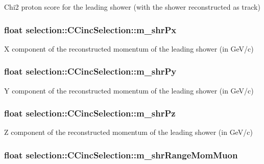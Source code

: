 Chi2 proton score for the leading shower (with the shower reconstructed as track) \hypertarget{classselection_1_1CCincSelection_a9a4858dd265bafd929aca940a2bc1342}{
\subsubsection[{m\-\_\-shr\-Px}]{\setlength{\rightskip}{0pt plus 5cm}float selection\-::\-C\-Cinc\-Selection\-::m\-\_\-shr\-Px\hspace{0.3cm}{\ttfamily [private]}}}\label{classselection_1_1CCincSelection_a9a4858dd265bafd929aca940a2bc1342}
X component of the reconstructed momentum of the leading shower (in Ge\-V/c) \hypertarget{classselection_1_1CCincSelection_af38a589c58d27b98779c05fe6ad078c7}{
\subsubsection[{m\-\_\-shr\-Py}]{\setlength{\rightskip}{0pt plus 5cm}float selection\-::\-C\-Cinc\-Selection\-::m\-\_\-shr\-Py\hspace{0.3cm}{\ttfamily [private]}}}\label{classselection_1_1CCincSelection_af38a589c58d27b98779c05fe6ad078c7}
Y component of the reconstructed momentum of the leading shower (in Ge\-V/c) \hypertarget{classselection_1_1CCincSelection_a8379b0c7d0b8a8d0b62ff0b353505146}{
\subsubsection[{m\-\_\-shr\-Pz}]{\setlength{\rightskip}{0pt plus 5cm}float selection\-::\-C\-Cinc\-Selection\-::m\-\_\-shr\-Pz\hspace{0.3cm}{\ttfamily [private]}}}\label{classselection_1_1CCincSelection_a8379b0c7d0b8a8d0b62ff0b353505146}
Z component of the reconstructed momentum of the leading shower (in Ge\-V/c) \hypertarget{classselection_1_1CCincSelection_a5dff6f4a03bc26649697adbd38241be3}{
\subsubsection[{m\-\_\-shr\-Range\-Mom\-Muon}]{\setlength{\rightskip}{0pt plus 5cm}float selection\-::\-C\-Cinc\-Selection\-::m\-\_\-shr\-Range\-Mom\-Muon\hspace{0.3cm}{\ttfamily [private]}}}\label{classselection_1_1CCincSelection_a5dff6f4a03bc26649697adbd38241be3}
